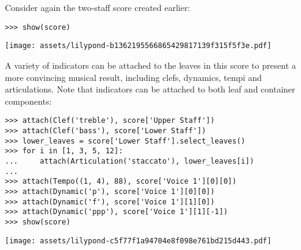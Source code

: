 \noindent Consider again the two-staff score created earlier:

\begin{comment}
<abjad>
show(score)
</abjad>
\end{comment}

\begin{abjadbookoutput}
\begin{singlespacing}
\vspace{-0.5\baselineskip}
\begin{verbatim}
>>> show(score)
\end{verbatim}
\noindent\texttt{[image: assets/lilypond-b1362195566865429817139f315f5f3e.pdf]}
\end{singlespacing}
\end{abjadbookoutput}

\noindent A variety of indicators can be attached to the leaves in this score
to present a more convincing musical result, including clefs, dynamics, tempi
and articulations. Note that indicators can be attached to both leaf and
container components:

\begin{comment}
<abjad>
attach(Clef('treble'), score['Upper Staff'])
attach(Clef('bass'), score['Lower Staff'])
lower_leaves = score['Lower Staff'].select_leaves()
for i in [1, 3, 5, 12]:
    attach(Articulation('staccato'), lower_leaves[i])

attach(Tempo((1, 4), 88), score['Voice 1'][0][0])
attach(Dynamic('p'), score['Voice 1'][0][0])
attach(Dynamic('f'), score['Voice 1'][1][0])
attach(Dynamic('ppp'), score['Voice 1'][1][-1])
show(score)
</abjad>
\end{comment}

\begin{abjadbookoutput}
\begin{singlespacing}
\vspace{-0.5\baselineskip}
\begin{verbatim}
>>> attach(Clef('treble'), score['Upper Staff'])
>>> attach(Clef('bass'), score['Lower Staff'])
>>> lower_leaves = score['Lower Staff'].select_leaves()
>>> for i in [1, 3, 5, 12]:
...     attach(Articulation('staccato'), lower_leaves[i])
...
>>> attach(Tempo((1, 4), 88), score['Voice 1'][0][0])
>>> attach(Dynamic('p'), score['Voice 1'][0][0])
>>> attach(Dynamic('f'), score['Voice 1'][1][0])
>>> attach(Dynamic('ppp'), score['Voice 1'][1][-1])
>>> show(score)
\end{verbatim}
\noindent\texttt{[image: assets/lilypond-c5f77f1a94704e8f098e761bd215d443.pdf]}
\end{singlespacing}
\end{abjadbookoutput}

